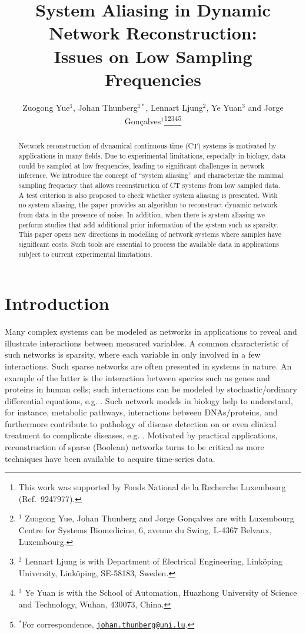 \documentclass[letterpaper,10pt,journal,final]{IEEEtran}
\title{\LARGE \bf
  System Aliasing in Dynamic Network Reconstruction: \\Issues on Low Sampling Frequencies
}
\author{Zuogong Yue$^{1}$, Johan Thunberg$^{1*}$, Lennart Ljung$^{2}$, Ye Yuan$^{3}$ and Jorge Gon\c{c}alves$^{1}$\thanks{This work was supported by Fonds National de la Recherche Luxembourg (Ref.~9247977).}\thanks{$^{1}$ Zuogong Yue, Johan Thunberg and Jorge Gon\c{c}alves are with
    Luxembourg Centre for Systems Biomedicine,
    6, avenue du Swing, L-4367 Belvaux, Luxembourg.}\thanks{$^{2}$ Lennart Ljung is with Department of Electrical Engineering, Link\"oping University, Link\"oping, SE-58183, Sweden.}\thanks{$^{3}$ Ye Yuan is with the School of Automation, Huazhong University of Science and Technology, Wuhan, 430073, China.}\thanks{\hspace*{0mm}$^{*}$For correspondence, \href{mailto:johan.thunberg@uni.lu}{\tt johan.thunberg@uni.lu}.}}
\theoremstyle{definition}
\theoremstyle{remark}
\begin{document}
\maketitle
\thispagestyle{empty}
\pagestyle{empty}

\begin{abstract}
  Network reconstruction of dynamical continuous-time (CT) systems is motivated
  by applications in many fields. Due to experimental limitations, especially in
  biology, data could be sampled at low frequencies, leading to significant
  challenges in network inference. We introduce the concept of “system aliasing”
  and characterize the minimal sampling frequency that allows reconstruction of
  CT systems from low sampled data.  A test criterion is also proposed to check
  whether system aliasing is presented.  With no system aliasing, the paper
  provides an algorithm to reconstruct dynamic network from data in the presence
  of noise. In addition, when there is system aliasing we perform studies that
  add additional prior information of the system such as sparsity. This paper
  opens new directions in modelling of network systems where samples have
  significant costs. Such tools are essential to process the available data in
  applications subject to current experimental limitations.
\end{abstract}

\section{Introduction}

Many complex systems can be modeled as networks in applications to reveal and
illustrate interactions between measured variables. A common characteristic of
such networks is sparsity, where each variable in only involved in a few
interactions. Such sparse networks are often presented in systems in nature.  An
example of the latter is the interaction between species such as genes and
proteins in human cells; such interactions can be modeled by stochastic/ordinary
differential equations, e.g. \cite{palsson2011systems}.  Such network models in
biology help to understand, for instance, metabolic pathways, interactions
between DNAs/proteins, and furthermore contribute to pathology of disease
detection on or even clinical treatment to complicate diseases,
e.g. \cite{Bar-Joseph2012}.  Motivated by practical applications,
reconstruction of sparse (Boolean) networks turns to be critical as more
techniques have been available to acquire time-series data.
\end{document}
